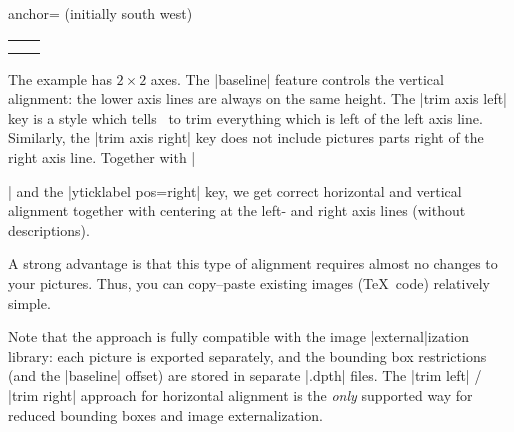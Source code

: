 \begin{pgfplotskey}{anchor= (initially south west)}
\begin{minipage}
\begin{tabular}
\begin{codeexample}[vbox]
\pgfplotsset{
	small,
	title=Requires experimental PGF!
}
\begin{center}
\begin{tabular}{rl}
	\begin{tikzpicture}[baseline,trim axis left]
		\begin{axis}
			\addplot {x};
		\end{axis}
	\end{tikzpicture}
	&
	\begin{tikzpicture}[baseline,trim axis right]
	\begin{axis}[
		ylabel={$f(x)=x^2$},
		yticklabel pos=right,
		ylabel style={font=\Huge}]
		\addplot {x^2};
	\end{axis}
	\end{tikzpicture}
	\\
	\begin{tikzpicture}[baseline,trim axis left]
	\begin{axis}[xlabel=$x$,xlabel style={font=\Huge}]
		\addplot {x^3};
	\end{axis}
	\end{tikzpicture}%
	&
	\begin{tikzpicture}[baseline,trim axis right]
	\begin{axis}[yticklabel pos=right]
		\addplot {x^4};
	\end{axis}
	\end{tikzpicture}%
	\\
\end{tabular}%
\end{center}
\end{codeexample}
\noindent The example has $2 \times 2$ axes. The |baseline| feature controls the vertical alignment: the lower axis lines are always on the same height. The |trim axis left| key is a style which tells \Tikz\ to trim everything which is left of the left axis line. Similarly, the |trim axis right| key does not include pictures parts right of the right axis line. Together with |\begin{center}| and the |yticklabel pos=right| key, we get correct horizontal and vertical alignment together with centering at the left- and right axis lines (without descriptions).

A strong advantage is that this type of alignment requires almost no changes to your pictures. Thus, you can copy--paste existing images (\TeX\ code) relatively simple.

Note that the approach is fully compatible with the image |external|ization library: each picture is exported separately, and the bounding box restrictions (and the |baseline| offset) are stored in separate |.dpth| files. The |trim left| / |trim right| approach for horizontal alignment is the \emph{only} supported way for reduced bounding boxes and image externalization.


\end{center}
\end{tabular}
\end{minipage}
\end{pgfplotskey}
